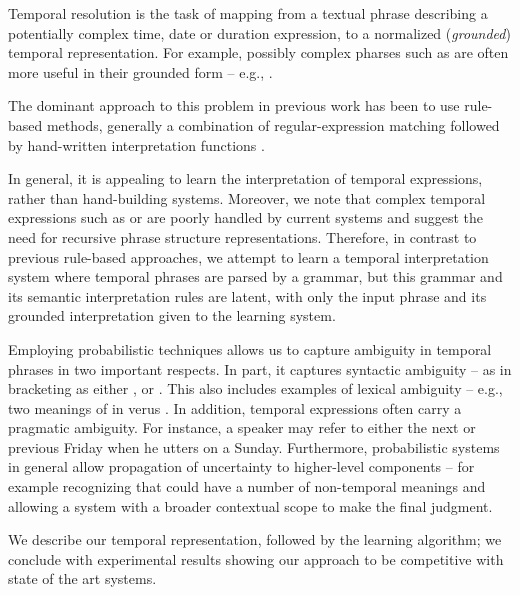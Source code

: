 
Temporal resolution is the task of mapping from a textual phrase describing
	a potentially complex time, date or duration expression, to a normalized
	(\textit{grounded}) temporal representation.
For example, possibly complex pharses such as  are
	often more useful in their grounded form -- e.g., .


The dominant approach to this problem in previous work has been to use
	rule-based methods, generally a combination of regular-expression matching
	followed by hand-written interpretation functions
	\cite{key:2000mani-temporal,key:2003saquete-temporal,key:2004puscasu-temporal,key:2010grover-temporal,key:2010uzzaman-temporal,key:2010kolomiyets-temporal,key:2010strotgen-temporal}.

In general, it is appealing to learn the interpretation of temporal expressions,
	rather than hand-building systems.
Moreover,
	we note that complex temporal expressions such as 
	or  are poorly handled by current
	systems and suggest the need for recursive phrase structure representations.
Therefore, in contrast to previous rule-based approaches, we attempt to learn
	a temporal interpretation system where temporal phrases are parsed by
	a grammar, but this grammar and its semantic interpretation rules are
	latent, with only the input phrase and its grounded interpretation given
	to the learning system.

Employing probabilistic techniques allows us to capture ambiguity in temporal 
	phrases in two important respects.
In part, it captures syntactic ambiguity -- as in  bracketing as either , or
	.
This also includes examples of lexical ambiguity -- e.g., two
	meanings of  in  verus .
In addition, temporal expressions often carry a pragmatic ambiguity.
For instance, a speaker may refer to either the next or previous Friday
	when he utters  on a Sunday.
Furthermore, probabilistic systems in general allow propagation of uncertainty
	to higher-level components -- for example recognizing that  could
	have a number of non-temporal meanings and allowing a system with a broader
	contextual scope to make the final judgment.

We describe our temporal representation,
	followed by the learning algorithm; 
	we conclude with experimental results showing our
	approach to be competitive with state of the art systems.


